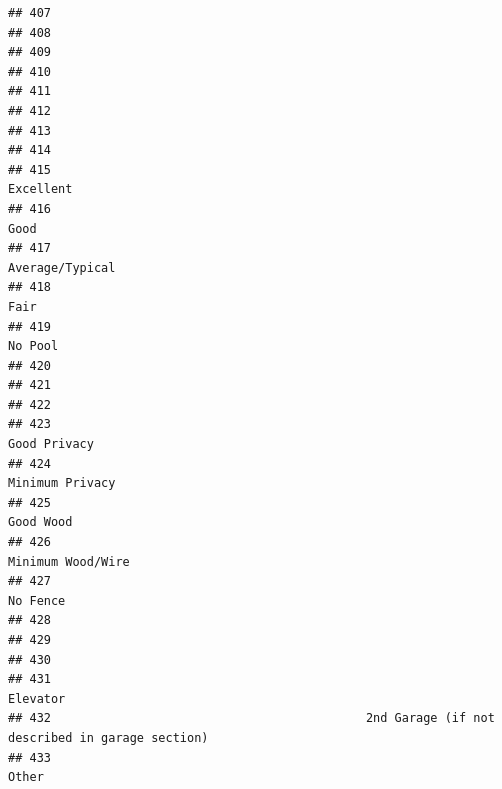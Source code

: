 \documentclass[
]{article}
\begin{document}
\begin{verbatim}
## 407                                                                                           
## 408                                                                                           
## 409                                                                                           
## 410                                                                                           
## 411                                                                                           
## 412                                                                                           
## 413                                                                                           
## 414                                                                                           
## 415                                                                                  Excellent
## 416                                                                                       Good
## 417                                                                            Average/Typical
## 418                                                                                       Fair
## 419                                                                                    No Pool
## 420                                                                                           
## 421                                                                                           
## 422                                                                                           
## 423                                                                               Good Privacy
## 424                                                                            Minimum Privacy
## 425                                                                                  Good Wood
## 426                                                                          Minimum Wood/Wire
## 427                                                                                   No Fence
## 428                                                                                           
## 429                                                                                           
## 430                                                                                           
## 431                                                                                   Elevator
## 432                                            2nd Garage (if not described in garage section)
## 433                                                                                      Other

\end{verbatim}
\end{document}
